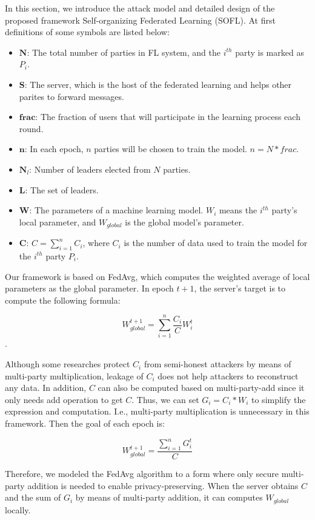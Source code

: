 In this section, we introduce the attack model and detailed design of the proposed framework Self-organizing Federated Learning (SOFL). At first definitions of some symbols are listed below:
\begin{itemize}
    \item $\textbf{N}$: The total number of parties in FL system, and the  $i^{th}$ party is marked as $P_i$.
    \item $\textbf{S}$: The server, which is the host of the federated learning and helps other parites to forward messages.
    \item $\textbf{frac}$: The fraction of users that will participate in the learning process each round.
    \item $\textbf{n}$: In each epoch, $n$ parties will be chosen to train the model. $n = N * frac$.
    \item $\textbf{N}_l$: Number of leaders elected from $N$ parties.
    \item $\textbf{L}$: The set of leaders.
    \item $\textbf{W}$: The parameters of a machine learning model. $W_i$ means the $i^{th}$ party's local parameter, and $W_{global}$ is the global model's parameter.
    \item $\textbf{C}$: $C = \sum_{i=1}^nC_i$, where $C_i$ is the number of data used to train the model for the $i^{th}$ party $P_i$.
\end{itemize}

Our framework is based on FedAvg, which computes the weighted average of local parameters as the global parameter. In epoch $t+1$, the server's target is to compute the following formula:

$$W_{global}^{t+1} = \sum_{i=1}^n\frac{C_i}{C}W_i^t$$. 

Although some researches protect $C_i$ from semi-honest attackers by means of multi-party multiplication, leakage of $C_i$ does not help attackers to reconstruct any data. In addition, $C$ can also be computed based on multi-party-add since it only needs add operation to get $C$. Thus, we can set $G_i = C_i * W_i$ to simplify the expression and computation. I.e., multi-party multiplication is unnecessary in this framework. Then the goal of each epoch is:

$$ W_{global}^{t+1} = \frac{\sum_{i=1}^nG_i^t}{C} $$

Therefore, we modeled the FedAvg algorithm to a form where only secure multi-party addition is needed to enable privacy-preserving. When the server obtains $C$ and the sum of $G_i$ by means of multi-party addition, it can computes $W_{global}$ locally.


